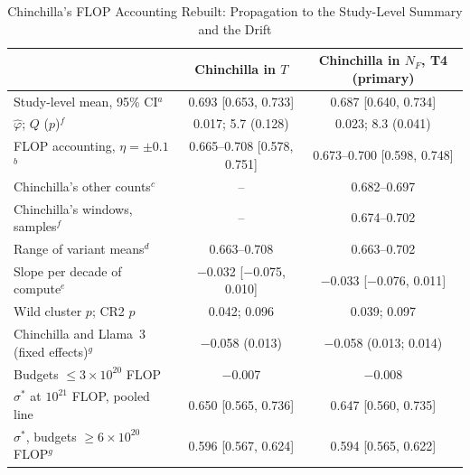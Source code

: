\begin{table}[tp]
\centering
\caption{Chinchilla's FLOP Accounting Rebuilt: Propagation to the Study-Level Summary and the Drift}
\label{tab:app-chinflop-prop}
\footnotesize
\setlength{\tabcolsep}{2pt}
\begin{tabular*}{\textwidth}{@{\extracolsep{\fill}}lcc@{}}
\toprule
 & Chinchilla in $T$ & Chinchilla in $N_F$, T4 (primary) \\
\midrule
Study-level mean, 95\% CI$^{a}$ & 0.693 [0.653, 0.733] & 0.687 [0.640, 0.734] \\
\quad $\hat\varphi$; $Q$ ($p$)$^{f}$ & 0.017; 5.7 (0.128) & 0.023; 8.3 (0.041) \\
\quad FLOP accounting, $\eta=\pm0.1$$^{b}$ & 0.665--0.708 [0.578, 0.751] & 0.673--0.700 [0.598, 0.748] \\
\quad Chinchilla's other counts$^{c}$ & -- & 0.682--0.697 \\
\quad Chinchilla's windows, samples$^{f}$ & -- & 0.674--0.702 \\
\quad Range of variant means$^{d}$ & 0.663--0.708 & 0.663--0.702 \\
Slope per decade of compute$^{e}$ & $-$0.032 [$-$0.075, 0.010] & $-$0.033 [$-$0.076, 0.011] \\
\quad Wild cluster $p$; CR2 $p$ & 0.042; 0.096 & 0.039; 0.097 \\
\quad Chinchilla and Llama~3 (fixed effects)$^{g}$ & $-$0.058 (0.013) & $-$0.058 (0.013; 0.014) \\
\quad Budgets $\le3\times10^{20}$ FLOP & $-$0.007 & $-$0.008 \\
$\sigma^*$ at $10^{21}$ FLOP, pooled line & 0.650 [0.565, 0.736] & 0.647 [0.560, 0.735] \\
$\sigma^*$, budgets $\ge6\times10^{20}$ FLOP$^{g}$ & 0.596 [0.567, 0.624] & 0.594 [0.565, 0.622] \\
\bottomrule
\end{tabular*}



\end{table}
